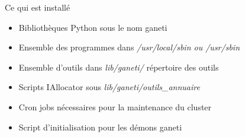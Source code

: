 \begin{frame}{Ce qui est installé}
\begin{itemize}
\item Bibliothèques Python sous le nom ganeti
\pause
\item Ensemble des programmes dans \emph{/usr/local/sbin ou /usr/sbin}
\pause
\item Ensemble d'outils dans \emph{lib/ganeti/} répertoire des outils
\pause
\item Scripts IAllocator sous \emph{lib/ganeti/outils\_annuaire}
\pause
\item Cron jobs nécessaires pour la maintenance du cluster
\pause
\item Script d'initialisation pour les démons ganeti
\end{itemize}
\end{frame}


%
